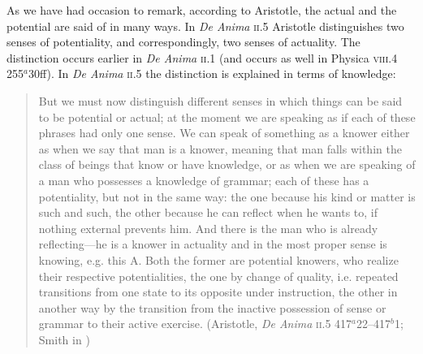 As we have had occasion to remark, according to Aristotle, the actual and the potential are said of in many ways. In \emph{De Anima} \textsc{ii}.5 Aristotle distinguishes two senses of potentiality, and correspondingly, two senses of actuality. The distinction occurs earlier in \emph{De Anima} \textsc{ii}.1 (and occurs as well in Physica \textsc{viii}.4 255\( ^{a} \)30ff). In \emph{De Anima} \textsc{ii}.5 the distinction is explained in terms of knowledge:
\begin{quote}
	But we must now distinguish different senses in which things can be said to be potential or actual; at the moment we are speaking as if each of these phrases had only one sense. We can speak of something as a knower either as when we say that man is a knower, meaning that man falls within the class of beings that know or have knowledge, or as when we are speaking of a man who possesses a knowledge of grammar; each of these has a potentiality, but not in the same way: the one because his kind or matter is such and such, the other because he can reflect when he wants to, if nothing external prevents him. And there is the man who is already reflecting---he is a knower in actuality and in the most proper sense is knowing, e.g. this A. Both the former are potential knowers, who realize their respective potentialities, the one by change of quality, i.e. repeated transitions from one state to its opposite under instruction, the other in another way by the transition from the inactive possession of sense or grammar to their active exercise. (Aristotle, \emph{De Anima} \textsc{ii}.5 417\( ^{a} \)22--417\( ^{b} \)1; Smith in \citealt[30]{Barnes:1984uq})
\end{quote}

